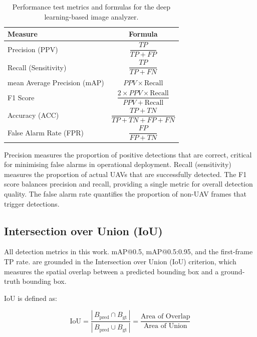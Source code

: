 \documentclass[12pt,a4paper]{report}
\renewcommand{\arraystretch}{1.1}
\begin{document}
\begin{table}[H]
\centering
\caption[Performance test metrics and formulas]{Performance test metrics and formulas for the deep learning-based image analyzer.}
\label{tab:performance_test}
\renewcommand{\arraystretch}{1.5}
\begin{tabular}{|l|c|}
\hline
\rowcolor{gray!20}
\textbf{Measure} & \textbf{Formula} \\
\hline
Precision (PPV) & $\dfrac{TP}{TP + FP}$ \\[0.5em]
\hline
Recall (Sensitivity) & $\dfrac{TP}{TP + FN}$ \\[0.5em]
\hline
mean Average Precision (mAP) & $PPV \times \text{Recall}$ \\[0.5em]
\hline
F1 Score & $\dfrac{2 \times PPV \times \text{Recall}}{PPV + \text{Recall}}$ \\[0.5em]
\hline
Accuracy (ACC) & $\dfrac{TP + TN}{TP + TN + FP + FN}$ \\[0.5em]
\hline
False Alarm Rate (FPR) & $\dfrac{FP}{FP + TN}$ \\[0.5em]
\hline
\end{tabular}
\end{table}

Precision measures the proportion of positive detections that are correct,
critical for minimising false alarms in operational deployment. Recall
(sensitivity) measures the proportion of actual UAVs that are successfully
detected. The F1 score balances precision and recall, providing a single
metric for overall detection quality. The false alarm rate quantifies the
proportion of non-UAV frames that trigger detections.

\subsection{Intersection over Union (IoU)}

All detection metrics in this work. mAP@0.5, mAP@0.5:0.95, and the
first-frame TP rate. are grounded in the Intersection over Union (IoU)
criterion, which measures the spatial overlap between a predicted bounding
box and a ground-truth bounding box.

IoU is defined as:

\begin{equation}
\text{IoU} = \frac{|\, B_{\text{pred}} \cap B_{\text{gt}} \,|}{|\, B_{\text{pred}} \cup B_{\text{gt}} \,|}
= \frac{\text{Area of Overlap}}{\text{Area of Union}}
\label{eq:iou}
\end{equation}
\end{document}
